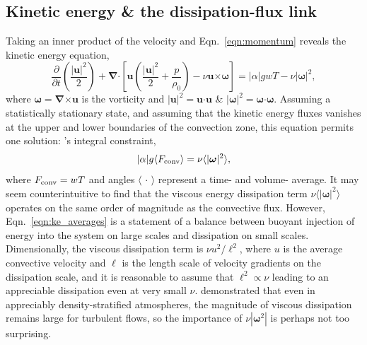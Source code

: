 \documentclass{aastex631}
\newcommand{\Fconv}{\ensuremath{F_{\rm{conv}}}}
\newcommand{\angles}[1]{\langle #1 \rangle}
\renewcommand{\vec}[1]{\boldsymbol{#1}}
\renewcommand{\dot}{\vec{\cdot}}
\newcommand{\grad}{\vec{\nabla}}
\newcommand{\cross}{\vec{\times}}
\begin{document}
\subsection{Kinetic energy \& the dissipation-flux link}
\label{sec:theory_energy}
Taking an inner product of the velocity and Eqn.~\ref{eqn:momentum} reveals the kinetic energy equation,
\begin{equation}
\frac{\partial}{\partial t}\left(\frac{|\vec{u}|^2}{2}\right) 
+ \grad\dot\left[\vec{u}\left(\frac{|\vec{u}|^2}{2} + \frac{p}{\rho_0}\right) - \nu\vec{u}\cross\vec{\omega}\right]
= |\alpha| g w T - \nu|\vec{\omega}|^2,
\label{eqn:kinetic_energy}
\end{equation}
where $\vec{\omega} = \grad\cross\vec{u}$ is the vorticity and $|\vec{u}|^2 = \vec{u}\dot\vec{u}$ \& $|\vec{\omega}|^2 = \vec{\omega}\dot\vec{\omega}$.
Assuming a statistically stationary state, and assuming that the kinetic energy fluxes vanishes at the upper and lower boundaries of the convection zone, this equation permits one solution: \citet{roxburgh1989}'s integral constraint,
\begin{equation}
|\alpha| g \angles{\Fconv} = \nu\angles{|\vec{\omega}|^2},
\label{eqn:ke_averages}
\end{equation}
where $\Fconv = w T$ and angles $\angles{\,\cdot\,}$ represent a time- and volume- average.
It may seem counterintuitive to find that the viscous energy dissipation term $\nu\angles{|\vec{\omega}|^2}$ operates on the same order of magnitude as the convective flux.
However, Eqn.~\ref{eqn:ke_averages} is a statement of a balance between buoyant injection of energy into the system on large scales and dissipation on small scales.
Dimensionally, the viscous dissipation term is $\nu u^2 / \ell^2$, where $u$ is the average convective velocity and $\ell$ is the length scale of velocity gradients on the dissipation scale, and it is reasonable to assume that $\ell^2 \propto \nu$ leading to an appreciable dissipation even at very small $\nu$.
\citet{currie_browning_2017} demonstrated that even in appreciably density-stratified atmospheres, the magnitude of viscous dissipation remains large for turbulent flows, so the importance of $\nu |\vec{\omega}^2|$ is perhaps not too surprising.
\end{document}
